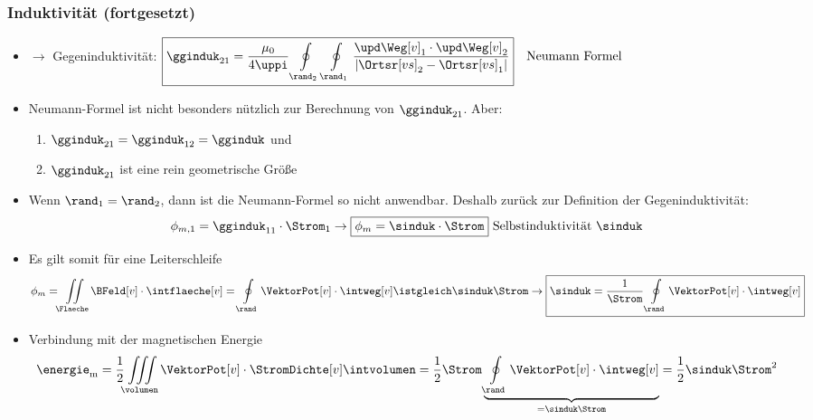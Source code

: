\begin{frame}
  \frametitle{Induktivität (fortgesetzt)}
\begin{itemize}[<+->]
\item $\to$ Gegeninduktivität:
$\boxed{\gginduk_{21} = \dfrac{\mu_0}{4 \uppi}  \oint\limits_{\rand_2} \oint\limits_{\rand_1} \dfrac{\upd \Weg[v]_1 \cdot \upd\Weg[v]_2}{\left| \Ortsr[vs]_2 - \Ortsr[vs]_1 \right|} } \quad\text{Neumann Formel}$
\item Neumann-Formel ist nicht besonders nützlich zur Berechnung von \(\gginduk_{21} \). Aber:
\begin{enumerate}
	\item \(\gginduk_{21} = \gginduk_{12} = \gginduk \) und
	\item \(\gginduk_{21} \) ist eine rein geometrische Größe
\end{enumerate}
\item Wenn \(\rand_1 = \rand_2 \), dann ist die Neumann-Formel so nicht anwendbar. Deshalb zurück zur Definition der Gegeninduktivität:
\begin{equation*}
	\phi_{m,1} = \gginduk_{11} \cdot \Strom_1 \to \boxed{\phi_{m} = \sinduk \cdot \Strom } \text{ Selbstinduktivität } \sinduk 
\end{equation*}
\item  Es gilt somit für eine Leiterschleife
\begin{equation*}
	\phi_m = \iint\limits_{\Flaeche} \BFeld[v] \cdot \intflaeche[v] = \oint\limits_{\rand} \VektorPot[v] \cdot \intweg[v] \istgleich \sinduk \Strom \to 	\boxed{\sinduk = \dfrac{1}{\Strom}\oint\limits_{\rand} \VektorPot[v] \cdot \intweg[v]}
      \end{equation*}
\item Verbindung mit der magnetischen Energie 
\begin{equation*}
	\energie_\mathrm{m} = \dfrac{1}{2}  \iiint\limits_{\volumen} \VektorPot[v] \cdot \StromDichte[v] \intvolumen
= \dfrac{1}{2} \Strom \underbrace{\oint\limits_{\rand} \VektorPot[v] \cdot \intweg[v]}_{=\sinduk \Strom} = \dfrac{1}{2} \sinduk \Strom^2 
\end{equation*}
\end{itemize}
\end{frame}

